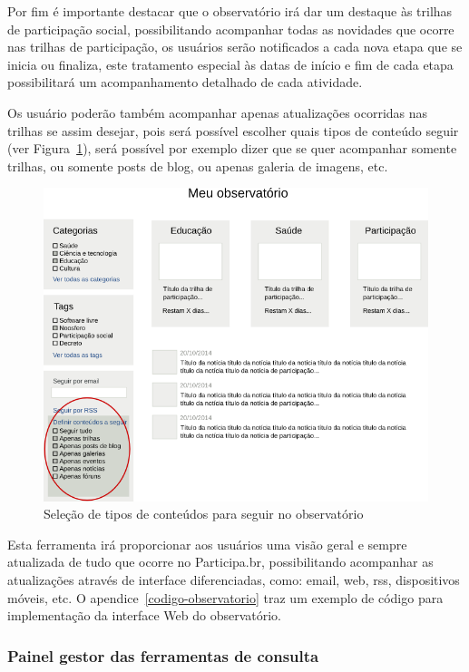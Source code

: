 \documentclass[12pt]{article}
\begin{document}
Por fim é importante destacar que o observatório irá dar um destaque às
trilhas de participação social, possibilitando acompanhar todas as novidades
que ocorre nas trilhas de participação, os usuários serão notificados a cada
nova etapa que se inicia ou finaliza, este tratamento especial às datas de
início e fim de cada etapa possibilitará um acompanhamento detalhado de cada
atividade.

Os usuário poderão também acompanhar apenas atualizações ocorridas nas trilhas
se assim desejar, pois será possível escolher quais tipos de conteúdo seguir
(ver Figura~\ref{observatorio-conteudo}), será possível por exemplo dizer que
se quer acompanhar somente trilhas, ou somente posts de blog, ou apenas
galeria de imagens, etc.

\begin{figure}[h]
\center
\includegraphics[scale=0.5]{observatorio-tipos-conteudo.png}
\caption{Seleção de tipos de conteúdos para seguir no observatório}
\label{observatorio-conteudo}
\end{figure}

Esta ferramenta irá proporcionar aos usuários uma visão geral e sempre
atualizada de tudo que ocorre no Participa.br, possibilitando acompanhar as
atualizações através de interface diferenciadas, como: email, web, rss,
dispositivos móveis, etc. O apendice~\ref{codigo-observatorio} traz um exemplo
de código para implementação da interface Web do observatório.

\subsubsection{Painel gestor das ferramentas de consulta}
\end{document}
